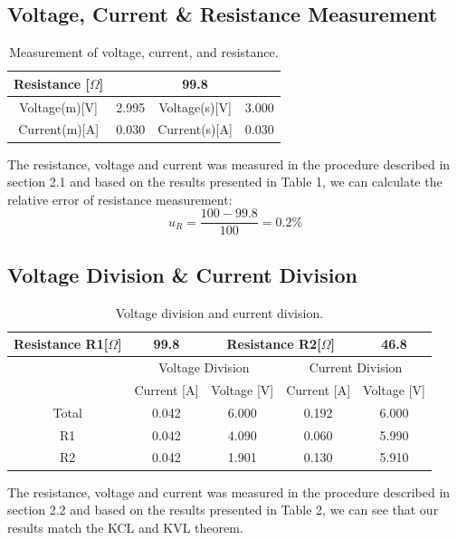 \documentclass[a4paper]{report}
\begin{document}
	\subsection{Voltage, Current \& Resistance Measurement}
	\begin{table}[H]
		\centering
		\begin{tabular}{|c|c|c|c|}
			\hline
			Resistance [$\Omega$]&\multicolumn{3}{|c||}{99.8}\\
			\hline
			Voltage(m)[V]&2.995&Voltage(s)[V]&3.000\\
			\hline
			Current(m)[A]&0.030&Current(s)[A]&0.030\\
			\hline
		\end{tabular}
		\caption{Measurement of voltage, current, and resistance.}
	\end{table}
	The resistance, voltage and current was measured in the procedure described in section 2.1 and based on the results presented in Table 1, we can calculate the relative error of resistance measurement:
	\begin{equation*}
	u_R=\dfrac{100-99.8}{100}=0.2\%
	\end{equation*}
	\subsection{Voltage Division \& Current Division}
	\begin{table}[H]
		\centering
		\begin{tabular}{|c|c|c|c|c|}
			\hline
			Resistance R1[$\Omega$]&99.8&\multicolumn{2}{c|}{Resistance R2[$\Omega$]}&46.8\\
			\hline
			\multirow{2}{*}{}&\multicolumn{2}{c|}{Voltage Division}&\multicolumn{2}{c|}{Current Division}\\
			\cline{2-5}
			&Current [A]&Voltage [V]&Current [A]&Voltage [V]\\
			\hline
			Total&0.042&6.000&0.192&6.000\\
			\hline
			R1&0.042&4.090&0.060&5.990\\
			\hline
			R2&0.042&1.901&0.130&5.910\\
			\hline
		\end{tabular}
		\caption{Voltage division and current division.}
	\end{table}
	The resistance, voltage and current was measured in the procedure described in section 2.2 and based on the results presented in Table 2, we can see that our results match the KCL and KVL theorem.
\end{document}
